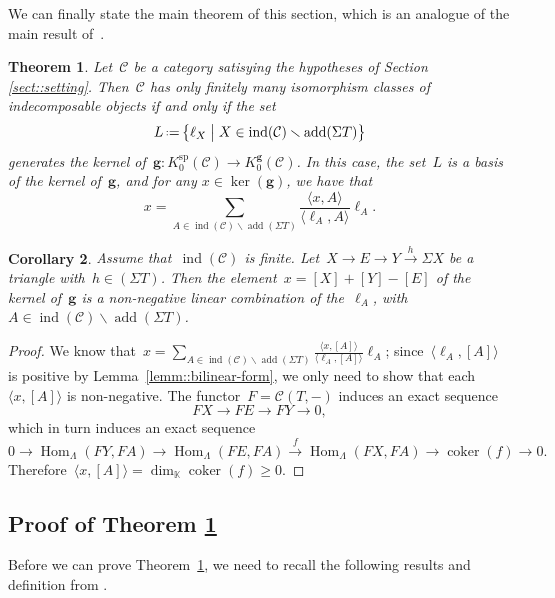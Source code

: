 \documentclass{amsart}
\newtheorem{theorem}{Theorem}[section]
\newtheorem{corollary}[theorem]{Corollary}
\theoremstyle{definition}
\renewcommand{\b}[1]{{\boldsymbol{#1}}} %
\newcommand{\bigset}[2]{\big\{ #1 \;\big|\; #2 \big\}} %
\newcommand{\ssm}{\smallsetminus} %
\newcommand{\eqdef}{\mbox{\,\raisebox{0.2ex}{\scriptsize\ensuremath{\mathrm:}}\ensuremath{=}\,}} %
\newcommand{\field}{\mathbb{K}}
\newcommand{\cat}{\mathcal{C}}
\newcommand{\Hom}[1]{\operatorname{Hom}_{#1}}
\newcommand{\susp}{\Sigma}
\newcommand{\add}{\operatorname{add}}
\newcommand{\spl}{\operatorname{sp}}
\newcommand{\Ksp}{K_0^{\spl}}
\newcommand{\Kg}{K_0^{\b{g}}}
\newcommand{\ind}{\operatorname{ind}}
\newcommand{\coker}{\operatorname{coker}}
\begin{document}
We can finally state the main theorem of this section, which is an analogue of the main result of~\cite{Auslander1984}.

\begin{theorem}
\label{theo::relations-g-vecteurs}
 Let~$\cat$ be a category satisying the hypotheses of Section \ref{sect::setting}.  Then~$\cat$ has only finitely many isomorphism classes of indecomposable objects if and only if the set
 \[
 L \eqdef \bigset{\ell_X}{X\in \ind(\cat) \ssm \add(\susp T)}
 \]
 generates the kernel of~$\b g:\Ksp(\cat) \to \Kg(\cat)$. 
 In this case, the set~$L$ is a basis of the kernel of~$\b g$, and for any $x\in \ker(\b g)$, we have that
 \[
  x= \sum_{A\in \ind(\cat) \ssm \add(\susp T)} \frac{\langle x, A \rangle}{\langle \ell_A, A \rangle} \ell_A.
 \]
\end{theorem}

\begin{corollary}
\label{corollary::meshes positively generate cluster cats}
 Assume that~$\ind(\cat)$ is finite.  Let~$X\xrightarrow{} E \xrightarrow{} Y \xrightarrow{h} \susp X$ be a triangle with~$h\in (\susp T)$.  Then the element~$x=[X]+[Y]-[E]$ of the kernel of~$\b g$ is a non-negative linear combination of the~$\ell_A$, with~$A\in \ind(\cat)\ssm \add(\susp T)$.
\end{corollary}
\begin{proof}
 We know that~$x=\sum_{A\in \ind(\cat) \ssm \add(\susp T)} \frac{\langle x, [A] \rangle}{\langle \ell_A, [A] \rangle} \ell_A$; since~$\langle \ell_A, [A] \rangle$ is positive by Lemma~\ref{lemm::bilinear-form}, we only need to show that each~$\langle x, [A] \rangle$ is non-negative. 
 The functor~$F=\cat(T,-)$ induces an exact sequence
 \[
  FX \to FE \to FY \to 0,
 \]
 which in turn induces an exact sequence
 \[
  0\to \Hom{\Lambda}(FY, FA) \to \Hom{\Lambda}(FE, FA) \xrightarrow{f} \Hom{\Lambda}(FX, FA) \to \coker(f) \to 0.
 \]
 Therefore~$\langle x, [A] \rangle = \dim_{\field} \coker(f) \geq 0$.
\end{proof}


\subsection{Proof of Theorem \ref{theo::relations-g-vecteurs}}

Before we can prove Theorem~\ref{theo::relations-g-vecteurs}, we need to recall the following results and definition from \cite{DehyKeller,Palu}.
\end{document}
